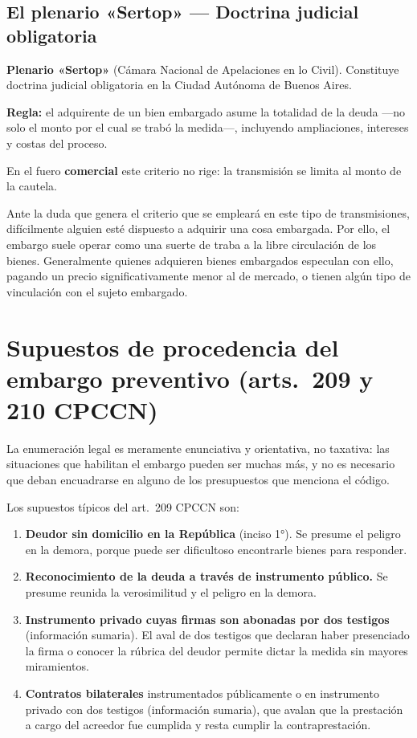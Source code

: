 \documentclass[12pt,oneside]{book}
\begin{document}
\subsection{El plenario «Sertop» --- Doctrina judicial obligatoria}

\begin{important}
\textbf{Plenario «Sertop»} (Cámara Nacional de Apelaciones en lo Civil). Constituye doctrina judicial obligatoria en la Ciudad Autónoma de Buenos Aires.

\textbf{Regla:} el adquirente de un bien embargado asume la totalidad de la deuda ---no solo el monto por el cual se trabó la medida---, incluyendo ampliaciones, intereses y costas del proceso.

En el fuero \textbf{comercial} este criterio no rige: la transmisión se limita al monto de la cautela.
\end{important}

Ante la duda que genera el criterio que se empleará en este tipo de transmisiones, difícilmente alguien esté dispuesto a adquirir una cosa embargada. Por ello, el embargo suele operar como una suerte de traba a la libre circulación de los bienes. Generalmente quienes adquieren bienes embargados especulan con ello, pagando un precio significativamente menor al de mercado, o tienen algún tipo de vinculación con el sujeto embargado.

\section{Supuestos de procedencia del embargo preventivo (arts.\ 209 y 210 CPCCN)}

La enumeración legal es meramente enunciativa y orientativa, no taxativa: las situaciones que habilitan el embargo pueden ser muchas más, y no es necesario que deban encuadrarse en alguno de los presupuestos que menciona el código.

Los supuestos típicos del art.\ 209 CPCCN son:
\begin{enumerate}[label=\textbf{\arabic*.}]
    \item \textbf{Deudor sin domicilio en la República} (inciso 1°). Se presume el peligro en la demora, porque puede ser dificultoso encontrarle bienes para responder.
    \item \textbf{Reconocimiento de la deuda a través de instrumento público.} Se presume reunida la verosimilitud y el peligro en la demora.
    \item \textbf{Instrumento privado cuyas firmas son abonadas por dos testigos} (información sumaria). El aval de dos testigos que declaran haber presenciado la firma o conocer la rúbrica del deudor permite dictar la medida sin mayores miramientos.
    \item \textbf{Contratos bilaterales} instrumentados públicamente o en instrumento privado con dos testigos (información sumaria), que avalan que la prestación a cargo del acreedor fue cumplida y resta cumplir la contraprestación.
\end{enumerate}
\end{document}
